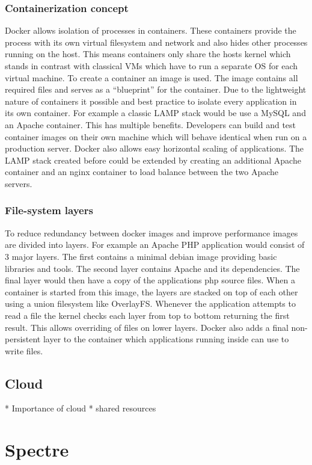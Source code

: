 \documentclass[conference,compsoc,final,a4paper]{IEEEtran}
\begin{document}
\subsubsection{Containerization concept}
Docker allows isolation of processes in containers. These containers provide the process with its own virtual filesystem and network and also hides other processes
running on the host. This means containers only share the hosts kernel which stands in contrast with classical VMs which have to run a separate OS for each virtual
machine. To create a container an image is used. The image contains all required files and serves as a \enquote{blueprint} for the container. Due to the lightweight
nature of containers it possible and best practice to isolate every application in its own container. For example a classic LAMP stack would be use a MySQL
and an Apache container. This has multiple benefits. Developers can build and test container images on their own machine which will behave
identical when run on a production server. Docker also allows easy horizontal scaling of applications. The LAMP stack created before could be extended by
creating an additional Apache container and an nginx container to load balance between the two Apache servers.
\subsubsection{File-system layers}
To reduce redundancy between docker images and improve performance images are divided into layers. For example an Apache PHP application would consist of 3
major layers. The first contains a minimal debian image providing basic libraries and tools. The second layer contains Apache and its dependencies. The final
layer would then have a copy of the applications php source files. When a container is started from this image, the layers are stacked on top of each other 
using a union filesystem like OverlayFS\cite{overlayfs}. Whenever the application attempts to read a file the kernel checks each layer from top to bottom
returning the first result. This allows overriding of files on lower layers. Docker also adds a final non-persistent layer to the container which applications
running inside can use to write files.
\subsection{Cloud}
* Importance of cloud
* shared resources

\section{Spectre}
\end{document}
